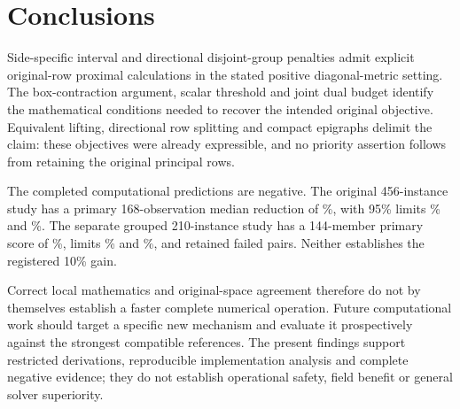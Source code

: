 \section{Conclusions}\label{sec:conclusions}
Side-specific interval and directional disjoint-group penalties
admit explicit original-row proximal calculations in the stated
positive diagonal-metric setting. The box-contraction argument,
scalar threshold and joint dual budget identify the mathematical
conditions needed to recover the intended original objective.
Equivalent lifting, directional row splitting and compact
epigraphs delimit the claim: these objectives were already
expressible, and no priority assertion follows from retaining
the original principal rows.

The completed computational predictions are negative. The
original 456-instance study has a primary 168-observation median
reduction of \OriginalEstimate\%, with 95\% limits \OriginalLower\%
and \OriginalUpper\%. The separate grouped 210-instance study
has a 144-member primary score of \PrimaryEstimate\%, limits
\PrimaryLower\% and \PrimaryUpper\%, and \PrimaryFailed{} retained
failed pairs. Neither establishes the registered 10\% gain.

Correct local mathematics and original-space agreement therefore
do not by themselves establish a faster complete numerical
operation. Future computational work should target a specific
new mechanism and evaluate it prospectively against the strongest
compatible references. The present findings support restricted
derivations, reproducible implementation analysis and complete
negative evidence; they do not establish operational safety,
field benefit or general solver superiority.
